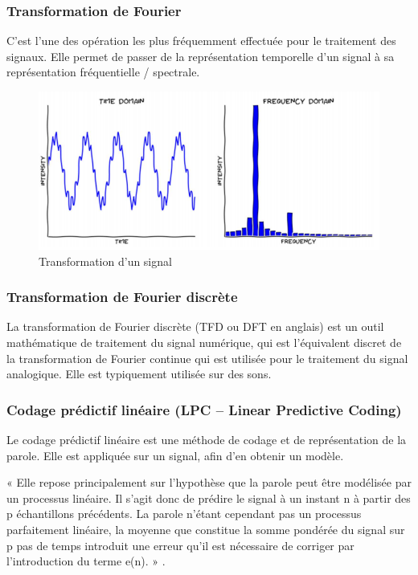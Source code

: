 \documentclass[a4paper, 12pt]{book}
\begin{document}
\subsubsection{Transformation de Fourier}

C’est l’une des opération les plus fréquemment effectuée pour le traitement des signaux. Elle permet de passer de la représentation temporelle d’un signal à sa représentation fréquentielle / spectrale.

\begin{figure}[htbp]
  \centering
  \includegraphics[width=1\linewidth]{fig/fourier.png}
  \caption{Transformation d’un signal}
\end{figure}

\subsubsection{Transformation de Fourier discrète}

La transformation de Fourier discrète (TFD ou DFT en anglais) est un outil mathématique de traitement du signal numérique, qui est l'équivalent discret de la transformation de Fourier continue qui est utilisée pour le traitement du signal analogique. Elle est typiquement utilisée sur des sons.

\subsubsection{Codage prédictif linéaire (LPC – Linear Predictive Coding)}

Le codage prédictif linéaire est une méthode de codage et de représentation de la parole. Elle est appliquée sur un signal, afin d’en obtenir un modèle.

« Elle repose principalement sur l’hypothèse que la parole peut être modélisée par un processus linéaire. Il s’agit donc de prédire le signal à un instant n à partir des p échantillons précédents. La parole n’étant cependant pas un processus parfaitement linéaire, la moyenne que constitue la somme pondérée du signal sur p pas de temps introduit une erreur qu’il est nécessaire de corriger par l’introduction du terme e(n). » .
\end{document}
